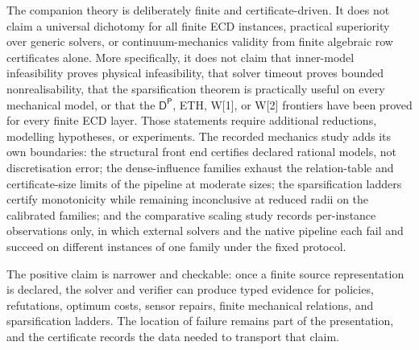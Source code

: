 \documentclass[11pt]{article}
\theoremstyle{plain}
\theoremstyle{definition}
\theoremstyle{remark}
\begin{document}
The companion theory is deliberately finite and certificate-driven.  It does not
claim a universal dichotomy for all finite ECD instances, practical superiority
over generic solvers, or continuum-mechanics validity from finite algebraic row
certificates alone.  More specifically, it does not claim that inner-model
infeasibility proves physical infeasibility, that solver timeout proves bounded
nonrealisability, that the sparsification theorem is practically useful on every
mechanical model, or that the \(\mathsf D^{\mathsf P}\), ETH, W[1], or W[2]
frontiers have been proved for every finite ECD layer.  Those statements require
additional reductions, modelling hypotheses, or experiments.  The recorded
mechanics study adds its own boundaries: the structural front end certifies
declared rational models, not discretisation error; the dense-influence families
exhaust the relation-table and certificate-size limits of the pipeline at
moderate sizes; the sparsification ladders certify monotonicity while remaining
inconclusive at reduced radii on the calibrated families; and the comparative
scaling study records per-instance observations only, in which external solvers
and the native pipeline each fail and succeed on different instances of one
family under the fixed protocol.

The positive claim is narrower and checkable: once a finite source
representation is declared, the solver and verifier can produce typed evidence
for policies, refutations, optimum costs, sensor repairs, finite mechanical
relations, and sparsification ladders.  The location of failure remains part of
the presentation, and the certificate records the data needed to transport that
claim.


\end{document}
